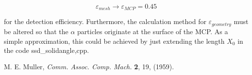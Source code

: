\documentclass{article}
\begin{document}
$$
\varepsilon_{mesh} \rightarrow \varepsilon_{MCP} = 0.45
$$

for the detection efficiency. Furthermore, the calculation method for $\varepsilon_{geometry}$ must be altered so that the $\alpha$ particles originate at the surface of the MCP. As a simple approximation, this could be achieved by just extending the length $X_0$ in the code ssd\_solidangle,cpp. 






\begin{thebibliography}{9}
	 M. E. Muller, {\it Comm. Assoc. Comp. Mach.} {\bf 2}, 19, (1959).
\end{thebibliography}
\end{document}
